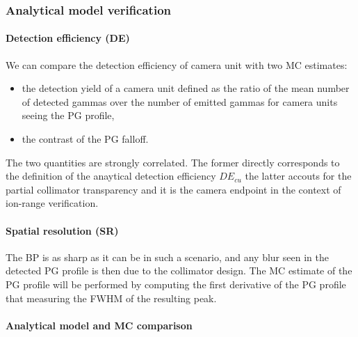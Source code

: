 \documentclass[a4paper,english]{article}
\begin{document}



\subsubsection{Analytical model verification}



\paragraph{Detection efficiency (DE)}

We can compare the detection efficiency of camera unit with two MC estimates:
\begin{itemize}
	\item the detection yield of a camera unit defined as the ratio of the mean number of detected gammas over the number of emitted gammas for camera units seeing the PG profile,
	\item the contrast of the PG falloff.
\end{itemize}
The two quantities are strongly correlated. The former directly corresponds to the definition of the anaytical detection efficiency $DE_{cu}$ the latter accouts for the partial collimator transparency and it is the camera endpoint in the context of ion-range verification.


\paragraph{Spatial resolution (SR)}
 The BP is as sharp as it can be in such a scenario, and any blur seen in the detected PG profile is then due to the collimator design. The MC estimate of the PG profile will be performed by computing the first derivative of the PG profile that measuring the FWHM of the resulting peak.

\paragraph{Analytical model and MC comparison}
\end{document}
